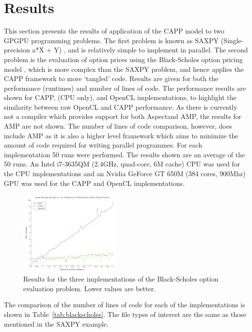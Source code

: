 \documentclass{sig-alternate-05-2015}
\begin{document}
\section{Results}\label{sec:results}

This section presents the results of application of the \mbox{CAPP} model to two
GPGPU programming problems. The first problem is known as SAXPY
(Single-precision a*X + Y) \cite{harris:saxpy}, and is relatively 
simple to implement in parallel. The second problem is the evaluation of option 
prices using the Black-Scholes option pricing model \cite{gems:blackscholes},
which is more complex than the SAXPY problem, and hence applies the  CAPP framework 
to more `tangled' \CPP code. Results are given for both the performance (runtimes) and
number of lines of code. The performance results are shown for CAPP, \CPP (CPU only), and OpenCL
implementations, to highlight the similarity between raw OpenCL and CAPP performance. As there is currently
not a compiler which provides support for both Aspect\CPP and \CPP AMP, the results for \CPP AMP are not shown. 
The number of lines of code comparison, however, does include \CPP AMP as it is also a higher level framework
which aims to minimize the amount of code required for writing parallel programmes.
For each implementation 50 runs were performed. The results shown are an average of the 50 runs. An Intel 
i7-3635QM (2.4GHz, quad-core, 6M cache) CPU was used for the CPU
implementations and an Nvidia GeForce GT 650M (384 cores, 900Mhz) GPU was used for
the CAPP and OpenCL implementations.

\begin{figure}[!t]
	\centering
	\includegraphics[width=0.45\textwidth]{BlackScholes}
	\caption{Results for the three implementations of the Black-Scholes option
		evaluation problem. Lower values are better.}
	\label{fig:blackscholes}
\end{figure}

The comparison of the number of lines of code for each of the implementations is
shown in Table~\ref{tab:blackscholes}. The file types of interest are the same as 
those mentioned in the SAXPY example. 
\end{document}
